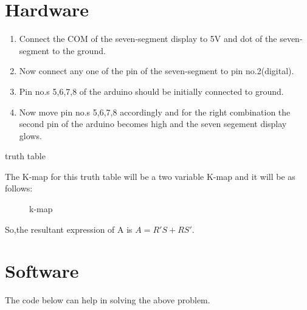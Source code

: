 \documentclass[12pt]{article}
\begin{document}
\section{Hardware}
	\begin{enumerate}
\item Connect the COM of the seven-segment display to 5V and dot of the seven-segment to the ground.
\item Now connect any one of the pin of the seven-segment to pin no.2(digital).
\item Pin no.s 5,6,7,8 of the arduino should be initially connected to ground.
\item Now move pin no.s 5,6,7,8 accordingly and for the right combination the second pin of the arduino becomes high and the seven segement display glows.
\end{enumerate}
\begin{table}[h]
\begin{center}
	
\end{center}
\caption{truth table}
\label{table 2}
\end{table}
The K-map for this truth table will be a two variable K-map and it will be as follows:
\begin{figure}[h]
	
\caption{k-map}
\label{fig2}
\end{figure}

So,the resultant expression of A is $A = R'S + RS'$.
\pagebreak
\section{Software}

The code below can help in solving the above problem.

\end{document}
